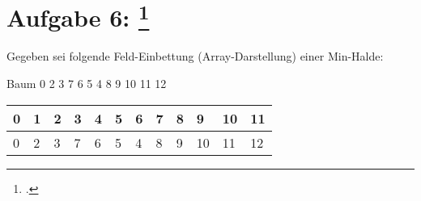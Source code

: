 \documentclass{bschlangaul-aufgabe}
\begin{document}
\section{Aufgabe 6:
\footcite{examen:46115:2017:09}}

Gegeben sei folgende Feld-Einbettung (Array-Darstellung) einer Min-Halde:

\begin{liProjektSprache}{Baum}
0 2 3 7 6 5 4 8 9 10 11 12
\end{liProjektSprache}

\begin{center}
\begin{tabular}{llllllllllll}
\bf{0}  & \bf{1}  & \bf{2}  & \bf{3}  & \bf{4}  & \bf{5}  & \bf{6}  & \bf{7}  & \bf{8}  & \bf{9}  & \bf{10} & \bf{11} \\
\hline
0       & 2       & 3       & 7       & 6       & 5       & 4       & 8       & 9       & 10      & 11      & 12      \\
\end{tabular}
\end{center}
\end{document}
